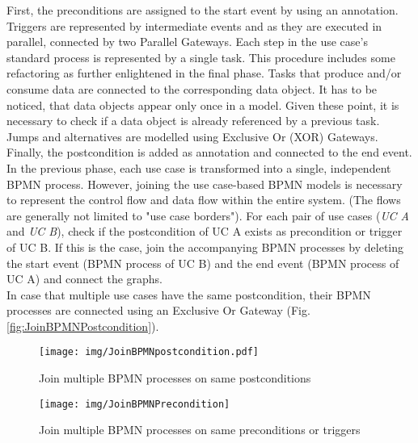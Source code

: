 \noindent
First, the preconditions are assigned to the start event by using an annotation. Triggers are represented by intermediate events and as they are executed in parallel, connected by two Parallel Gateways. Each step in the use case's standard process is represented by a single task. This procedure includes some refactoring as further enlightened in the final phase. Tasks that produce and/or consume data are connected to the corresponding data object. It has to be noticed, that data objects appear only once in a model. Given these point, it is necessary to check if a data object is already referenced by a previous task. Jumps and alternatives are modelled using Exclusive Or (XOR) Gateways. Finally, the postcondition is added as annotation and connected to the end event. \\
In the previous phase, each use case is transformed into a single, independent BPMN process. However, joining the use case-based BPMN models is necessary to represent the control flow and data flow within the entire system. (The flows are generally not limited to "use case borders"). For each pair of use cases (\textit{UC A} and \textit{UC B}), check if the postcondition of UC A exists as precondition or trigger of UC B. If this is the case, join the accompanying BPMN processes by deleting the start event (BPMN process of UC B) and the end event (BPMN process of UC A) and connect the graphs. \\
In case that multiple use cases have the same postcondition, their BPMN processes are connected using an Exclusive Or Gateway (Fig.\ref{fig:JoinBPMNPostcondition}). 

\begin{figure}[h!]
	\centering
	\begin{minipage}{0.45\textwidth}
		\centering
		\texttt{[image: img/JoinBPMNpostcondition.pdf]} %
		\caption{Join multiple BPMN processes on same postconditions}
		\label{fig:JoinBPMNPostcondition} %
	\end{minipage}\hfill
	\begin{minipage}{0.45\textwidth}
		\centering
		\texttt{[image: img/JoinBPMNPrecondition]} %
		\caption{Join multiple BPMN processes on same preconditions or triggers}
		\label{fig:JoinBPMNPrecondition}
	\end{minipage}
\end{figure}

